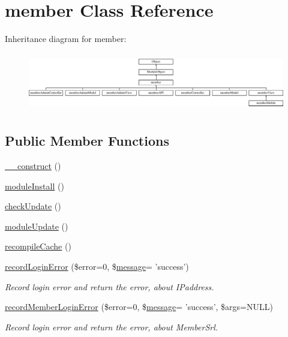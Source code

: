 \hypertarget{classmember}{\section{member Class Reference}
\label{classmember}
}
Inheritance diagram for member\-:\begin{figure}[H]
\begin{center}
\leavevmode
\includegraphics[height=2.580645cm]{classmember}
\end{center}
\end{figure}
\subsection*{Public Member Functions}
\begin{DoxyCompactItemize}
\item 
\hyperlink{classmember_aed3c03e3c5cf6c6bffa9f8c4406df9c7}{\-\_\-\-\_\-construct} ()
\item 
\hyperlink{classmember_a5834fa338d03eedcb5e84bb8ccac305b}{module\-Install} ()
\item 
\hyperlink{classmember_ad28f96bfab17efa94a9f2607a8b42a3d}{check\-Update} ()
\item 
\hyperlink{classmember_a72b7382e568644ccadb69b67e4504086}{module\-Update} ()
\item 
\hyperlink{classmember_ab5bc32f3821f7cba98e34703679c69ee}{recompile\-Cache} ()
\item 
\hyperlink{classmember_a557d0a329f29c5490a53c6e5a58dcab9}{record\-Login\-Error} (\$error=0, \$\hyperlink{classmessage}{message}= 'success')
\begin{DoxyCompactList}\small\item\em Record login error and return the error, about I\-Paddress. \end{DoxyCompactList}\item 
\hyperlink{classmember_a629cfb29393b629f0b39e4467a3d44d4}{record\-Member\-Login\-Error} (\$error=0, \$\hyperlink{classmessage}{message}= 'success', \$args=N\-U\-L\-L)
\begin{DoxyCompactList}\small\item\em Record login error and return the error, about Member\-Srl. \end{DoxyCompactList}\end{DoxyCompactItemize}
